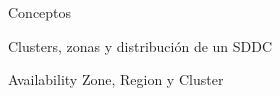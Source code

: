 \begin{section}{Conceptos}
\begin{subsection}{Clusters, zonas y distribución de un SDDC}
\begin{subsubsection}{Availability Zone, Region y Cluster}
\end{subsubsection}


\end{subsection}

\end{section}

